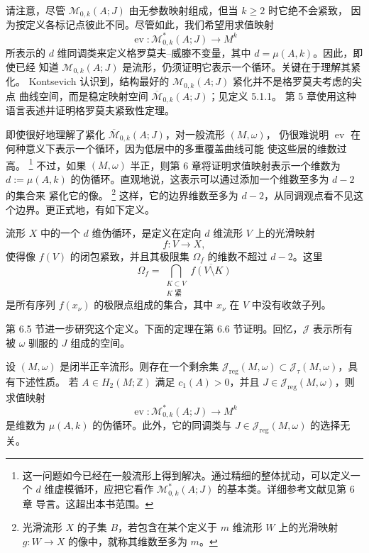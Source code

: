 请注意，尽管 $\mathcal M_{0,k}(A;J)$ 由无参数映射组成，但当 $k\ge2$ 时它绝不会紧致，
因为按定义各标记点彼此不同。尽管如此，我们希望用求值映射
\[
  \operatorname{ev}:\mathcal M^*_{0,k}(A;J)\longrightarrow M^k
\]
所表示的 $d$ 维同调类来定义格罗莫夫--威滕不变量，其中 $d=\mu(A,k)$。因此，即使已经
知道 $\mathcal M_{0,k}(A;J)$ 是流形，仍须证明它表示一个循环。关键在于理解其紧化。
Kontsevich 认识到，结构最好的 $\mathcal M_{0,k}(A;J)$ 紧化并不是格罗莫夫考虑的尖点
曲线空间，而是稳定映射空间 $\overline{\mathcal M}_{0,k}(A;J)$；见定义 5.1.1。
第 5 章使用这种语言表述并证明格罗莫夫紧致性定理。

即使很好地理解了紧化 $\overline{\mathcal M}_{0,k}(A;J)$，对一般流形 $(M,\omega)$，
仍很难说明 $\operatorname{ev}$ 在何种意义下表示一个循环，因为低层中的多重覆盖曲线可能
使这些层的维数过高。
\footnote{这一问题如今已经在一般流形上得到解决。通过精细的整体扰动，可以定义一个
$d$ 维虚模循环，应把它看作 $\mathcal M^*_{0,k}(A;J)$ 的基本类。详细参考文献见第 6 章
导言。这超出本书范围。}
不过，如果 $(M,\omega)$ 半正，则第 6 章将证明求值映射表示一个维数为
$d:=\mu(A,k)$ 的伪循环。直观地说，这表示可以通过添加一个维数至多为 $d-2$ 的集合来
紧化它的像。
\footnote{光滑流形 $X$ 的子集 $B$，若包含在某个定义于 $m$ 维流形 $W$ 上的光滑映射
$g:W\to X$ 的像中，就称其维数至多为 $m$。}
这样，它的边界维数至多为 $d-2$，从同调观点看不见这个边界。更正式地，有如下定义。

\begin{nameddefinition}
流形 $X$ 中的一个 $d$ 维伪循环，是定义在定向 $d$ 维流形 $V$ 上的光滑映射
\[
  f:V\to X,
\]
使得像 $f(V)$ 的闭包紧致，并且其极限集 $\Omega_f$ 的维数不超过 $d-2$。这里
\[
  \Omega_f=
  \bigcap_{\substack{K\subset V\\K\text{ 紧}}}
  \overline{f(V\setminus K)}
\]
是所有序列 $f(x_\nu)$ 的极限点组成的集合，其中 $x_\nu$ 在 $V$ 中没有收敛子列。
\end{nameddefinition}

第 6.5 节进一步研究这个定义。下面的定理在第 6.6 节证明。回忆，$\mathcal J$ 表示所有
被 $\omega$ 驯服的 $J$ 组成的空间。

\begin{namedtheorem}[C]
设 $(M,\omega)$ 是闭半正辛流形。则存在一个剩余集
$\mathcal J_{\mathrm{reg}}(M,\omega)\subset\mathcal J_\tau(M,\omega)$，具有下述性质。
若 $A\in H_2(M;\mathbb Z)$ 满足 $c_1(A)>0$，并且
$J\in\mathcal J_{\mathrm{reg}}(M,\omega)$，则求值映射
\[
  \operatorname{ev}:\mathcal M^*_{0,k}(A;J)\longrightarrow M^k
\]
是维数为 $\mu(A,k)$ 的伪循环。此外，它的同调类与
$J\in\mathcal J_{\mathrm{reg}}(M,\omega)$ 的选择无关。
\end{namedtheorem}

